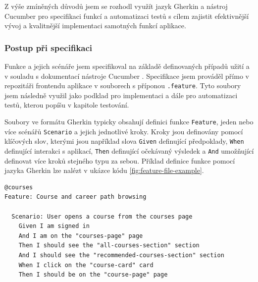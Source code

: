 Z výše zmíněných důvodů jsem se rozhodl využít jazyk Gherkin a nástroj Cucumber pro specifikaci funkcí a automatizaci testů s cílem zajistit efektivnější vývoj a kvalitnější implementaci samotných funkcí aplikace.

\subsubsection{Postup při specifikaci}

Funkce a jejich scénáře jsem specifikoval na základě definovaných případů užití a v souladu s dokumentací nástroje Cucumber \cite{CucumberDocs}. Specifikace jsem prováděl přímo v repozitáři frontendu aplikace v souborech s příponou \texttt{.feature}. Tyto soubory jsem následně využil jako podklad pro implementaci a dále pro automatizaci testů, kterou popíšu v kapitole testování.

Soubory ve formátu Gherkin typicky obsahují definici funkce \texttt{Feature}, jeden nebo více scénářů \texttt{Scenario} a jejich jednotlivé kroky. Kroky jsou definovány pomocí klíčových slov, kterými jsou například slova \texttt{Given} definující předpoklady, \texttt{When} definující interakci s aplikací, \texttt{Then} definující očekávaný výsledek a \texttt{And} umožňující definovat více kroků stejného typu za sebou. Příklad definice funkce pomocí jazyka Gherkin lze nalézt v ukázce kódu \ref{fig:feature-file-example}.

\begin{listing}[ht]
    \begin{verbatim}
@courses
Feature: Course and career path browsing

  Scenario: User opens a course from the courses page
    Given I am signed in
    And I am on the "courses-page" page
    Then I should see the "all-courses-section" section
    And I should see the "recommended-courses-section" section
    When I click on the "course-card" card
    Then I should be on the "course-page" page
    \end{verbatim}
    \caption{Ukázka specifikace funkce prohlížení kurzů pomocí jazyka Gherkin}
    \label{fig:feature-file-example}
\end{listing}
